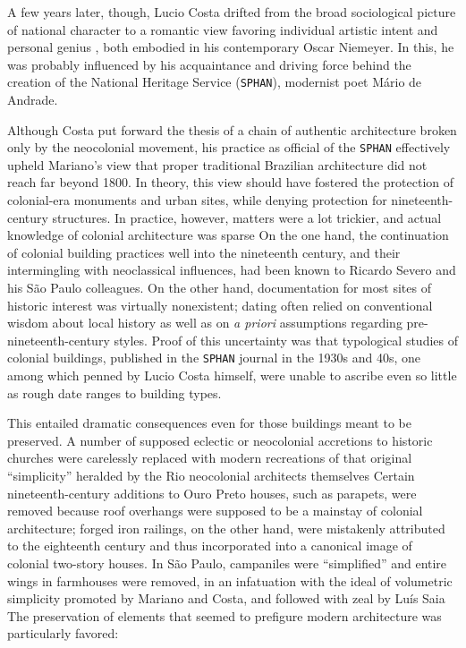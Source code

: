 A few years later, though, Lucio Costa drifted from the broad
sociological picture of national character to a romantic view favoring
individual artistic intent \autocite[p.~113]{costa:2007consideracoes}
and personal genius \autocite[2]{ferraz:1948depoimento}, both embodied
in his contemporary Oscar Niemeyer. In this, he was probably influenced
by his acquaintance and driving force behind the creation of the
National Heritage Service (\texttt{SPHAN}), modernist poet Mário de
Andrade.

Although Costa put forward the thesis of a chain of authentic
architecture broken only by the neocolonial movement, his practice as
official of the \texttt{SPHAN} effectively upheld Mariano's view that
proper traditional Brazilian architecture did not reach far beyond 1800.
In theory, this view should have fostered the protection of colonial-era
monuments and urban sites, while denying protection for
nineteenth-century structures. In practice, however, matters were a lot
trickier, and actual knowledge of colonial architecture was sparse
\autocite[p.~25]{pinheiro:2012neocolonial} On the one hand, the
continuation of colonial building practices well into the nineteenth
century, and their intermingling with neoclassical influences, had been
known to Ricardo Severo and his São Paulo colleagues. On the other hand,
documentation for most sites of historic interest was virtually
nonexistent; dating often relied on conventional wisdom about local
history as well as on \emph{a priori} assumptions regarding
pre-nineteenth-century styles. Proof of this uncertainty was that
typological studies of colonial buildings, published in the
\texttt{SPHAN} journal in the 1930s and 40s, one among which penned by
Lucio Costa himself, were unable to ascribe even so little as rough date
ranges to building types.

This entailed dramatic consequences even for those buildings meant to be
preserved. A number of supposed eclectic or neocolonial accretions to
historic churches were carelessly replaced with modern recreations of
that original ``simplicity'' heralded by the Rio neocolonial architects
themselves \autocite[p.~238]{pinheiro:2012neocolonial} Certain
nineteenth-century additions to Ouro Preto houses, such as parapets,
were removed because roof overhangs were supposed to be a mainstay of
colonial architecture; forged iron railings, on the other hand, were
mistakenly attributed to the eighteenth century and thus incorporated
into a canonical image of colonial two-story houses. In São Paulo,
campaniles were ``simplified'' and entire wings in farmhouses were
removed, in an infatuation with the ideal of volumetric simplicity
promoted by Mariano and Costa, and followed with zeal by Luís Saia
\autocite[p.~61]{mayumi:2008taipa} The preservation of elements that
seemed to prefigure modern architecture was particularly favored:


